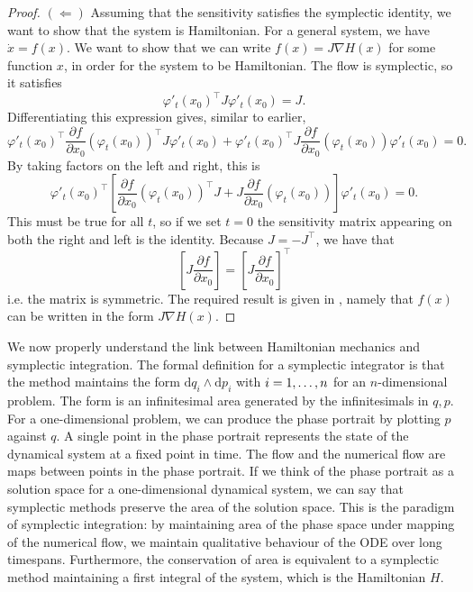 \begin{proof}
$(\Leftarrow)$ Assuming that the sensitivity satisfies the symplectic identity, we want to show that the system is Hamiltonian.
For a general system, we have $\dot{x} = f(x)$. We want to show that we can write $f(x) = J \nabla H(x)$ for some function $x$, in order for the system to be Hamiltonian.
The flow is symplectic, so it satisfies
\begin{equation*}
	\varphi'_t(x_0)^\top J \varphi'_t(x_0) = J. 
\end{equation*}
Differentiating this expression gives, similar to earlier,
\begin{equation*}
	\varphi'_t(x_0)^\top \frac{\partial f}{\partial x_0}(\varphi_t(x_0))^\top J \varphi'_t(x_0) + \varphi'_t(x_0)^\top J \frac{\partial f}{\partial x_0}(\varphi_t(x_0)) \varphi'_t(x_0) = 0.
\end{equation*}
By taking factors on the left and right, this is
\begin{equation*}
	\varphi'_t(x_0)^\top \left[ \frac{\partial f}{\partial x_0}(\varphi_t(x_0))^\top J + J \frac{\partial f}{\partial x_0}(\varphi_t(x_0)) \right] \varphi'_t(x_0) = 0.
\end{equation*}
This must be true for all $t$, so if we set $t=0$ the sensitivity matrix appearing on both the right and left is the identity.
Because $J = -J^\top$, we have that
\begin{equation*}
	\left[ J \frac{\partial f}{\partial x_0} \right]= \left[ J \frac{\partial f}{\partial x_0} \right]^\top
\end{equation*}
i.e. the matrix is symmetric. 
The required result is given in \cite{gni2006}, namely that $f(x)$ can be written in the form $J \nabla H(x)$.
\end{proof}

We now properly understand the link between Hamiltonian mechanics and symplectic integration.
The formal definition for a symplectic integrator is that the method maintains the form $\mathrm{d}q_i \wedge \mathrm{d}p_i$ with $i = 1, \mathellipsis, n$ for an $n$-dimensional problem.
The form is an infinitesimal area generated by the infinitesimals in $q, p$.
For a one-dimensional problem, we can produce the phase portrait by plotting $p$ against $q$.
A single point in the phase portrait represents the state of the dynamical system at a fixed point in time.
The flow and the numerical flow are maps between points in the phase portrait.
If we think of the phase portrait as a solution space for a one-dimensional dynamical system, we can say that symplectic methods preserve the area of the solution space.
This is the paradigm of symplectic integration: by maintaining area of the phase space under mapping of the numerical flow, we maintain qualitative behaviour of the ODE over long timespans.
Furthermore, the conservation of area is equivalent to a symplectic method maintaining a first integral of the system, which is the Hamiltonian $H$.

